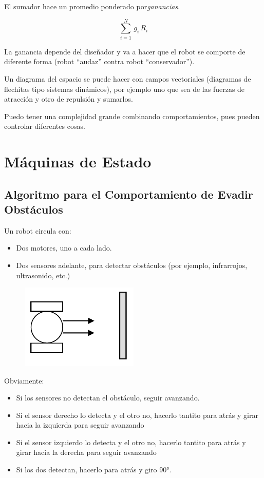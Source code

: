 El sumador hace un promedio ponderado por\textit{ganancias}.

$$
\sum_{i=1}^{N} \, g_i \, R_i
$$

La ganancia depende del diseñador y va a hacer que el robot se comporte de diferente forma (robot “audaz” contra robot “conservador”).

Un diagrama del espacio se puede hacer con campos vectoriales (diagramas de flechitas tipo sistemas dinámicos), por ejemplo uno que sea de las fuerzas de atracción y otro de repulsión y sumarlos.

Puedo tener una complejidad grande combinando comportamientos, pues pueden controlar diferentes cosas.


\section{Máquinas de Estado}
\subsection{Algoritmo para el Comportamiento de Evadir Obstáculos}

Un robot circula con:

\begin{itemize}
	\item[\textbullet] Dos motores, uno a cada lado.
	\item[\textbullet] Dos sensores adelante, para detectar obstáculos (por ejemplo, infrarrojos, ultrasonido, etc.)
\end{itemize}

\begin{figure}[h!]
	\centering
	\includegraphics[width=0.5\textwidth]{images/img54.png}
	\label{figura54}
\end{figure}

Obviamente:
\begin{itemize}
	\item[\textbullet] Si los sensores no detectan el obstáculo, seguir 		avanzando.
	\item[\textbullet] Si el sensor derecho lo detecta y el otro no, hacerlo tantito para atrás y girar hacia la izquierda para seguir avanzando
	\item[\textbullet]Si el sensor izquierdo lo detecta y el otro no, hacerlo tantito para atrás y girar hacia la derecha para seguir avanzando
	\item[\textbullet]Si los dos detectan, hacerlo para atrás y giro 90°.
\end{itemize}

